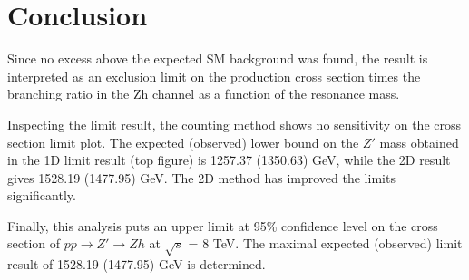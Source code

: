 \section{Conclusion}
Since no excess above the expected SM background was found, the result is interpreted as an exclusion limit on the production cross section times the branching ratio in the Zh channel as a function of the resonance mass.

Inspecting the limit result, the counting method shows no sensitivity on the cross section limit plot. The expected (observed) lower bound on the $Z'$ mass obtained in the 1D limit result (top figure) is 1257.37 (1350.63) GeV, while the 2D result gives 1528.19 (1477.95) GeV. The 2D method has improved the limits significantly.

Finally, this analysis puts an upper limit at 95\% confidence level on the cross section of $pp\rightarrow Z'\rightarrow Zh$ at $\sqrt{s}$ = 8 TeV. The maximal expected (observed) limit result of 1528.19 (1477.95) GeV is determined.

